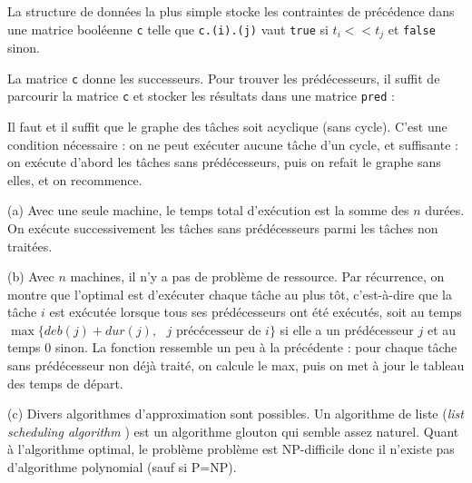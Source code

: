 \Corrige

\Q
La structure de données la plus simple stocke les contraintes de précédence dans une matrice booléenne \texttt{c} telle que \texttt{c.(i).(j)} vaut \texttt{true} si $t_i << t_j$ et \texttt{false} sinon.
\medskip

La matrice \texttt{c} donne les successeurs. Pour trouver les prédécesseurs, il suffit de parcourir la matrice \texttt{c} et stocker les résultats dans une matrice \texttt{pred} :



\Q
Il faut et il suffit que le graphe des tâches soit acyclique (sans cycle). C'est une condition nécessaire : on ne peut exécuter aucune tâche d'un cycle, et suffisante : on exécute d'abord les tâches sans prédécesseurs, puis on refait le graphe sans elles, et on recommence.

\Q
(a) Avec une seule machine, le temps total d'exécution est la somme des $n$ durées. On exécute successivement les tâches sans prédécesseurs parmi les tâches non traitées.



(b) Avec $n$ machines, il n'y a pas de problème de ressource. Par récurrence, on montre que l'optimal est d'exécuter chaque tâche au plus tôt, c'est-à-dire que la tâche $i$ est exécutée lorsque tous ses prédécesseurs ont été exécutés, soit au temps $\max \{deb(j) + dur(j),\textrm{ $j$ précécesseur de $i$}\}$ si elle a un prédécesseur $j$ et au temps 0 sinon. La fonction ressemble un peu à la précédente : pour chaque tâche sans prédécesseur non déjà traité, on calcule le max, puis on met à jour le tableau des temps de départ.
\medskip

(c) Divers algorithmes d'approximation sont possibles. Un algorithme de liste (\og \textit{list scheduling algorithm} \fg{}) est un algorithme glouton qui semble assez naturel. Quant à l'algorithme optimal, le problème problème est NP-difficile donc il n'existe pas d'algorithme polynomial (sauf si P=NP).
\bigskip

\Fin
